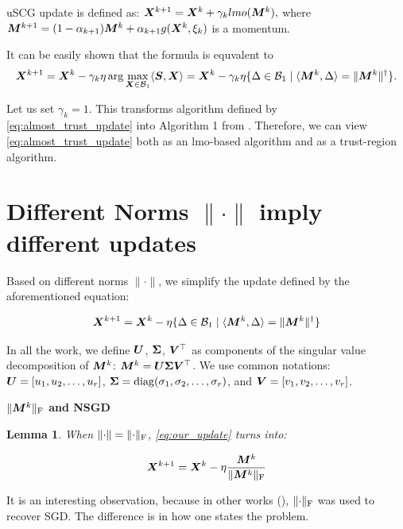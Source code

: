 \documentclass{article} %
\newtheorem{lemma}{Lemma}
\newcommand{\norm}[1]{\lVert #1\rVert}
\newcommand{\cB}{\mathcal{B}}
\DeclarePairedDelimiter{\normf}{\|}{\|_\mathrm{F}}
\def\<#1,#2>{\langle #1,#2\rangle}
\DeclareMathOperator{\diag}{diag}
\begin{document}
    uSCG update is defined as:
    ${\bm{X}}^{k+1} = {\bm{X}}^{k} + \gamma_k lmo({\bm{M}}^k),$ where ${\bm{M}}^{k+1} = (1-\alpha_{k+1}){\bm{M}}^{k} + \alpha_{k+1}g({\bm{X}}^k, \xi_k)$ is a momentum.

    It can be easily shown that the formula is equvalent to
    \begin{equation}\label{eq:almost_trust_update}
        \mX^{k+1} = \mX^{k} - \gamma_k\eta \arg\max_{\mX \in \cB_1} \<\mS, \mX> = \mX^{k} - \gamma_k\eta \{\Delta \in \cB_1 \mid \<\mM^k, \Delta> = \norm{\mM^k}^\dagger\}.
    \end{equation}

    Let us set $\gamma_k = 1$. This transforms algorithm defined by \cref{eq:almost_trust_update} into Algorithm 1 from \cite{kovalev2025understanding}. Therefore, we can view \cref{eq:almost_trust_update} both as an lmo-based algorithm and as a trust-region algorithm.

\section{Different Norms $\norm{\cdot}$ imply different updates}

    Based on different norms $\norm{\cdot}$, we simplify the update defined by the aforementioned equation:

    \begin{equation}\label{eq:our_update}
        \mX^{k+1} = \mX^{k} - \eta \{\Delta \in \cB_1 \mid \<\mM^k, \Delta> = \norm{\mM^k}^\dagger\}
    \end{equation}

    In all the work, we define ${\bm{U}}$, ${\bm{\Sigma}}$, ${\bm{V}}^\top$ as components of the singular value decomposition of ${\bm{M}}^k$: ${\bm{M}}^k = {\bm{U}} {\bm{\Sigma}} {\bm{V}}^\top$. We use common notations: ${\bm{U}} = [u_1, u_2, \dots, u_r]$, $\mSigma = \diag(\sigma_1, \sigma_2, \dots, \sigma_r)$, and  ${\bm{V}} = [v_1, v_2, \dots, v_r]$.

    {\bf $\normf{\mM^{k}}$ and NSGD}

        \begin{lemma}\label{lemma:nsgd_update}
            When $\norm{\cdot} = \normf{\cdot}$, \cref{eq:our_update} turns into:

            \begin{equation}\label{eq:nsgd_update}
                \mX^{k+1} = \mX^{k} - \eta \frac{\mM^k}{\normf{\mM^k}}
            \end{equation}

        \end{lemma}
        It is an interesting observation, because in other works (\cite{pethick2025training}), $\normf{\cdot}$ was used to recover SGD. The difference is in how one states the problem.
\end{document}
